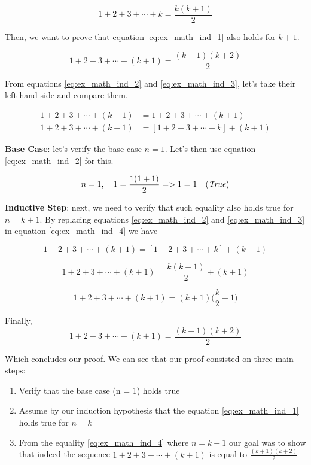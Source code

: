 \documentclass[a4paper,10pt]{article}
\begin{document}
\begin{equation}\label{eq:ex_math_ind_2}
    1 + 2 + 3 + \cdots + k = \frac{k(k+1)}{2}
\end{equation}

Then, we want to prove that equation \ref{eq:ex_math_ind_1} also holds for $k + 1$. 

\begin{equation}\label{eq:ex_math_ind_3}
    1 + 2 + 3 + \cdots + (k + 1) = \frac{(k+1)(k + 2)}{2}
\end{equation}

From equations \ref{eq:ex_math_ind_2} and \ref{eq:ex_math_ind_3}, let's take their left-hand side and compare them. 

\begin{equation}\label{eq:ex_math_ind_4}
\begin{aligned}
1 + 2 + 3 + \cdots + (k + 1) &= 1 + 2 + 3 + \cdots + (k + 1) \\
1 + 2 + 3 + \cdots + (k + 1) &= [1 + 2 + 3 + \cdots + k] + (k + 1)
\end{aligned}
\end{equation}

\textbf{Base Case}: let's verify the base case $n = 1$. Let's then use equation \ref{eq:ex_math_ind_2} for this.

$$
n = 1, \quad 1 = \frac{1(1 + 1)}{2} => 1 = 1 \quad \text{(\textit{True})}
$$

\textbf{Inductive Step}: next, we need to verify that such equality also holds true for $n = k + 1$. By replacing equations \ref{eq:ex_math_ind_2} and \ref{eq:ex_math_ind_3} in equation \ref{eq:ex_math_ind_4} we have

$$
1 + 2 + 3 + \cdots + (k + 1) = [1 + 2 + 3 + \cdots + k] + (k + 1) 
$$

$$
1 + 2 + 3 + \cdots + (k + 1) = \frac{k(k+1)}{2} + (k + 1)
$$

$$1 + 2 + 3 + \cdots + (k + 1) = (k + 1)\Big( \frac{k}{2} + 1 \Big)$$

Finally, 
\
\begin{equation}
    1 + 2 + 3 + \cdots + (k + 1) = \frac{(k + 1)(k + 2)}{2}
\end{equation}

Which concludes our proof. We can see that our proof consisted on three main steps:

\begin{enumerate}
    \item Verify that the base case (n = 1) holds true
    
    \item Assume by our induction hypothesis that the equation \ref{eq:ex_math_ind_1} holds true for $n = k$

    \item From the equality \ref{eq:ex_math_ind_4} where $n = k + 1$ our goal was to show that indeed the sequence $1 + 2 + 3 + \cdots + (k + 1)$ is equal to $\frac{(k + 1)(k + 2)}{2}$
\end{enumerate}
\end{document}
